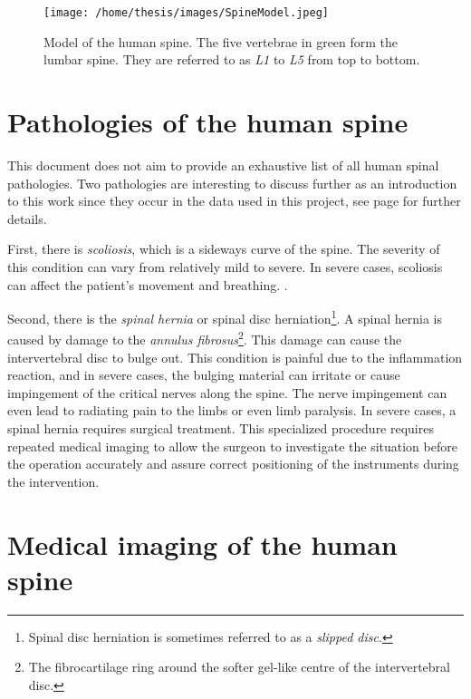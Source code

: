 \begin{SCfigure}[][h!]
    \centering
    \texttt{[image: /home/thesis/images/SpineModel.jpeg]}
    \caption{\label{fig:spineimage}Model of the human spine. The five vertebrae in green form the lumbar spine. They are referred to as \textit{L1} to \textit{L5} from top to bottom. }
\end{SCfigure}

\section{Pathologies of the human spine}
\par{
    This document does not aim to provide an exhaustive list of all human spinal pathologies. 
    Two pathologies are interesting to discuss further as an introduction to this work since they occur in the data used in this project, see page \pageref{sec:datasets} for further details.
}
\par{
    First, there is \textit{scoliosis}, which is a sideways curve of the spine.
    The severity of this condition can vary from relatively mild to severe. 
    In severe cases, scoliosis can affect the patient's movement and breathing.
    .
}
\par{
    Second, there is the \textit{spinal hernia} or spinal disc herniation\footnote{Spinal disc herniation is sometimes referred to as a \textit{slipped disc}.}. 
    A spinal hernia is caused by damage to the \textit{annulus fibrosus}\footnote{The fibrocartilage ring around the softer gel-like centre of the intervertebral disc.}. 
    This damage can cause the intervertebral disc to bulge out. 
    This condition is painful due to the inflammation reaction, and in severe cases, the bulging material can irritate or cause impingement of the critical nerves along the spine.
    The nerve impingement can even lead to radiating pain to the limbs or even limb paralysis.
    In severe cases, a spinal hernia requires surgical treatment.
    This specialized procedure requires repeated medical imaging to allow the surgeon to investigate the situation before the operation accurately and assure correct positioning of the instruments during the intervention.
}

\section{Medical imaging of the human spine\label{sec:medical_imaging}}

